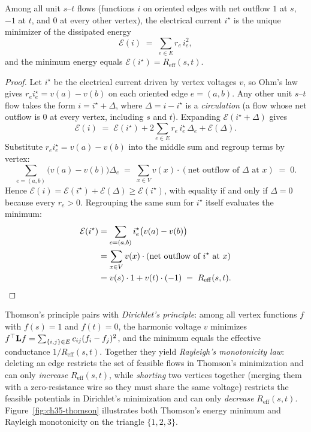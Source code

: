 \begin{theorem}\label{ch35:thm-thomson}
Among all unit $s$--$t$ flows (functions $i$ on oriented edges with net outflow $1$ at $s$, $-1$ at $t$, and $0$ at every other vertex), the electrical current $i^\star$ is the unique minimizer of the dissipated energy
\[
  \mathcal{E}(i) \;=\; \sum_{e\in E} r_e\,i_e^2,
\]
and the minimum energy equals $\mathcal{E}(i^\star) = R_{\mathrm{eff}}(s,t)$.
\end{theorem}

\begin{proof}
Let $i^\star$ be the electrical current driven by vertex voltages $v$, so Ohm's law gives $r_e i^\star_e=v(a)-v(b)$ on each oriented edge $e=(a,b)$. Any other unit $s$--$t$ flow takes the form $i=i^\star+\Delta$, where $\Delta = i - i^\star$ is a \emph{circulation} (a flow whose net outflow is $0$ at every vertex, including $s$ and $t$). Expanding $\mathcal{E}(i^\star+\Delta)$ gives
\[
  \mathcal{E}(i) \;=\; \mathcal{E}(i^\star)+2\sum_{e\in E} r_e\, i^\star_e\,\Delta_e+\mathcal{E}(\Delta).
\]
Substitute $r_e i^\star_e = v(a)-v(b)$ into the middle sum and regroup terms by vertex:
\[
  \sum_{e=(a,b)}\bigl(v(a)-v(b)\bigr)\Delta_e
  \;=\; \sum_{x\in V} v(x)\cdot(\text{net outflow of }\Delta\text{ at }x) \;=\; 0.
\]
Hence $\mathcal{E}(i)=\mathcal{E}(i^\star)+\mathcal{E}(\Delta)\ge\mathcal{E}(i^\star)$, with equality if and only if $\Delta=0$ because every $r_e>0$. Regrouping the same sum for $i^\star$ itself evaluates the minimum:
\begin{align*}
  \mathcal{E}(i^\star) &= \sum_{e=(a,b)} i^\star_e\bigl(v(a)-v(b)\bigr) \\
  &= \sum_{x\in V} v(x)\cdot(\text{net outflow of }i^\star\text{ at }x) \\
  &= v(s)\cdot 1 + v(t)\cdot(-1) \;=\; R_{\mathrm{eff}}(s,t). \qedhere
\end{align*}
\end{proof}

Thomson's principle pairs with \emph{Dirichlet's principle}: among all vertex functions $f$ with $f(s)=1$ and $f(t)=0$, the harmonic voltage $v$ minimizes $f^\top\mathbf{L} f = \sum_{\{i,j\}\in E}c_{ij}(f_i-f_j)^2$, and the minimum equals the effective conductance $1/R_{\mathrm{eff}}(s,t)$. Together they yield \emph{Rayleigh's monotonicity law}: deleting an edge restricts the set of feasible flows in Thomson's minimization and can only \emph{increase} $R_{\mathrm{eff}}(s,t)$, while \emph{shorting} two vertices together (merging them with a zero-resistance wire so they must share the same voltage) restricts the feasible potentials in Dirichlet's minimization and can only \emph{decrease} $R_{\mathrm{eff}}(s,t)$. Figure~\ref{fig:ch35-thomson} illustrates both Thomson's energy minimum and Rayleigh monotonicity on the triangle $\{1,2,3\}$.

